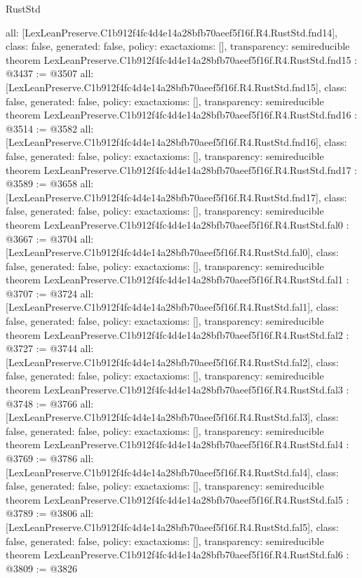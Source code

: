 \begin{lexlean}{RustStd}
\begin{coremodule}
{  all: [LexLeanPreserve.C1b912f4fc4d4e14a28bfb70aeef5f16f.R4.RustStd.fnd14],
  class: false,
  generated: false,
  policy: exact{axioms: []},
  transparency: semireducible
}
theorem LexLeanPreserve.C1b912f4fc4d4e14a28bfb70aeef5f16f.R4.RustStd.fnd15 : @3437 := @3507 {
  all: [LexLeanPreserve.C1b912f4fc4d4e14a28bfb70aeef5f16f.R4.RustStd.fnd15],
  class: false,
  generated: false,
  policy: exact{axioms: []},
  transparency: semireducible
}
theorem LexLeanPreserve.C1b912f4fc4d4e14a28bfb70aeef5f16f.R4.RustStd.fnd16 : @3514 := @3582 {
  all: [LexLeanPreserve.C1b912f4fc4d4e14a28bfb70aeef5f16f.R4.RustStd.fnd16],
  class: false,
  generated: false,
  policy: exact{axioms: []},
  transparency: semireducible
}
theorem LexLeanPreserve.C1b912f4fc4d4e14a28bfb70aeef5f16f.R4.RustStd.fnd17 : @3589 := @3658 {
  all: [LexLeanPreserve.C1b912f4fc4d4e14a28bfb70aeef5f16f.R4.RustStd.fnd17],
  class: false,
  generated: false,
  policy: exact{axioms: []},
  transparency: semireducible
}
theorem LexLeanPreserve.C1b912f4fc4d4e14a28bfb70aeef5f16f.R4.RustStd.fal0 : @3667 := @3704 {
  all: [LexLeanPreserve.C1b912f4fc4d4e14a28bfb70aeef5f16f.R4.RustStd.fal0],
  class: false,
  generated: false,
  policy: exact{axioms: []},
  transparency: semireducible
}
theorem LexLeanPreserve.C1b912f4fc4d4e14a28bfb70aeef5f16f.R4.RustStd.fal1 : @3707 := @3724 {
  all: [LexLeanPreserve.C1b912f4fc4d4e14a28bfb70aeef5f16f.R4.RustStd.fal1],
  class: false,
  generated: false,
  policy: exact{axioms: []},
  transparency: semireducible
}
theorem LexLeanPreserve.C1b912f4fc4d4e14a28bfb70aeef5f16f.R4.RustStd.fal2 : @3727 := @3744 {
  all: [LexLeanPreserve.C1b912f4fc4d4e14a28bfb70aeef5f16f.R4.RustStd.fal2],
  class: false,
  generated: false,
  policy: exact{axioms: []},
  transparency: semireducible
}
theorem LexLeanPreserve.C1b912f4fc4d4e14a28bfb70aeef5f16f.R4.RustStd.fal3 : @3748 := @3766 {
  all: [LexLeanPreserve.C1b912f4fc4d4e14a28bfb70aeef5f16f.R4.RustStd.fal3],
  class: false,
  generated: false,
  policy: exact{axioms: []},
  transparency: semireducible
}
theorem LexLeanPreserve.C1b912f4fc4d4e14a28bfb70aeef5f16f.R4.RustStd.fal4 : @3769 := @3786 {
  all: [LexLeanPreserve.C1b912f4fc4d4e14a28bfb70aeef5f16f.R4.RustStd.fal4],
  class: false,
  generated: false,
  policy: exact{axioms: []},
  transparency: semireducible
}
theorem LexLeanPreserve.C1b912f4fc4d4e14a28bfb70aeef5f16f.R4.RustStd.fal5 : @3789 := @3806 {
  all: [LexLeanPreserve.C1b912f4fc4d4e14a28bfb70aeef5f16f.R4.RustStd.fal5],
  class: false,
  generated: false,
  policy: exact{axioms: []},
  transparency: semireducible
}
theorem LexLeanPreserve.C1b912f4fc4d4e14a28bfb70aeef5f16f.R4.RustStd.fal6 : @3809 := @3826 {
}
\end{coremodule}
\end{lexlean}
